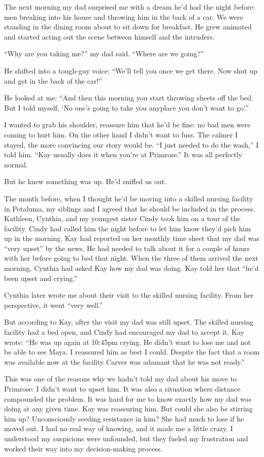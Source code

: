 \documentclass[12pt]{book}
\begin{document}
The next morning my dad surprised me with a dream he'd had the night before: men breaking into his house and throwing him in the back of a car. We were standing in the dining room about to sit down for breakfast. He grew animated and started acting out the scene between himself and the intruders.

``Why are you taking me?'' my dad said. ``Where are we going?''

He shifted into a tough-guy voice: ``We'll tell you once we get there. Now shut up and get in the back of the car!''

He looked at me: ``And then this morning you start throwing sheets off the bed. But I told myself, `No one's going to take you anyplace you don't want to go'.''

I wanted to grab his shoulder, reassure him that he'd be fine: no bad men were coming to hurt him. On the other hand I didn't want to fuss. The calmer I stayed, the more convincing our story would be. ``I just needed to do the wash,'' I told him. ``Kay usually does it when you're at Primrose.'' It was all perfectly normal.

But he knew something was up. He'd sniffed us out.

The month before, when I thought he'd be moving into a skilled nursing facility in Petaluma, my siblings and I agreed that he should be included in the process. Kathleen, Cynthia, and my youngest sister Cindy took him on a tour of the facility. Cindy had called him the night before to let him know they'd pick him up in the morning. Kay had reported on her monthly time sheet that my dad was ``very upset'' by the news. He had needed to talk about it for a couple of hours with her before going to bed that night. When the three of them arrived the next morning, Cynthia had asked Kay how my dad was doing. Kay told her that ``he'd been upset and crying.''

Cynthia later wrote me about their visit to the skilled nursing facility. From her perspective, it went ``very well.''

But according to Kay, after the visit my dad was still upset. The skilled nursing facility had a bed open, and Cindy had encouraged my dad to accept it. Kay wrote: ``He was up again at 10:45pm crying. He didn't want to lose me and not be able to see Maya. I reassured him as best I could. Despite the fact that a room was available now at the facility Carver was adamant that he was not ready.''

This was one of the reasons why we hadn't told my dad about his move to Primrose: I didn't want to upset him. It was also a situation where distance compounded the problem. It was hard for me to know exactly how my dad was doing at any given time. Kay was reassuring him. But could she also be stirring him up? Unconsciously seeding resistance in him? She had much to lose if he moved out. I had no real way of knowing, and it made me a little crazy. I understood my suspicions were unfounded, but they fueled my frustration and worked their way into my decision-making process.
\end{document}
